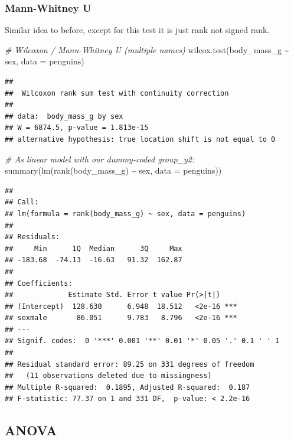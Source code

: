 \documentclass[
  openany]{book}
\newenvironment{Shaded}{\begin{snugshade}}{\end{snugshade}}
\newcommand{\AttributeTok}[1]{\textcolor[rgb]{0.77,0.63,0.00}{#1}}
\newcommand{\CommentTok}[1]{\textcolor[rgb]{0.56,0.35,0.01}{\textit{#1}}}
\newcommand{\FunctionTok}[1]{\textcolor[rgb]{0.00,0.00,0.00}{#1}}
\newcommand{\NormalTok}[1]{#1}
\newcommand{\SpecialCharTok}[1]{\textcolor[rgb]{0.00,0.00,0.00}{#1}}
\begin{document}
\hypertarget{mann-whitney-u}{%
\subsubsection{Mann-Whitney U}\label{mann-whitney-u}}

Similar idea to before, except for this test it is just rank not signed rank.

\begin{Shaded}
\begin{Highlighting}[]
\CommentTok{\# Wilcoxon / Mann{-}Whitney U (multiple names)}
\FunctionTok{wilcox.test}\NormalTok{(body\_mass\_g }\SpecialCharTok{\textasciitilde{}}\NormalTok{ sex, }\AttributeTok{data =}\NormalTok{ penguins)}
\end{Highlighting}
\end{Shaded}

\begin{verbatim}
## 
##  Wilcoxon rank sum test with continuity correction
## 
## data:  body_mass_g by sex
## W = 6874.5, p-value = 1.813e-15
## alternative hypothesis: true location shift is not equal to 0
\end{verbatim}

\begin{Shaded}
\begin{Highlighting}[]
\CommentTok{\# As linear model with our dummy{-}coded group\_y2:}
\FunctionTok{summary}\NormalTok{(}\FunctionTok{lm}\NormalTok{(}\FunctionTok{rank}\NormalTok{(body\_mass\_g) }\SpecialCharTok{\textasciitilde{}}\NormalTok{ sex, }\AttributeTok{data =}\NormalTok{ penguins))}
\end{Highlighting}
\end{Shaded}

\begin{verbatim}
## 
## Call:
## lm(formula = rank(body_mass_g) ~ sex, data = penguins)
## 
## Residuals:
##     Min      1Q  Median      3Q     Max 
## -183.68  -74.13  -16.63   91.32  162.87 
## 
## Coefficients:
##             Estimate Std. Error t value Pr(>|t|)    
## (Intercept)  128.630      6.948  18.512   <2e-16 ***
## sexmale       86.051      9.783   8.796   <2e-16 ***
## ---
## Signif. codes:  0 '***' 0.001 '**' 0.01 '*' 0.05 '.' 0.1 ' ' 1
## 
## Residual standard error: 89.25 on 331 degrees of freedom
##   (11 observations deleted due to missingness)
## Multiple R-squared:  0.1895, Adjusted R-squared:  0.187 
## F-statistic: 77.37 on 1 and 331 DF,  p-value: < 2.2e-16
\end{verbatim}

\hypertarget{anova}{%
\subsection{ANOVA}\label{anova}}
\end{document}
